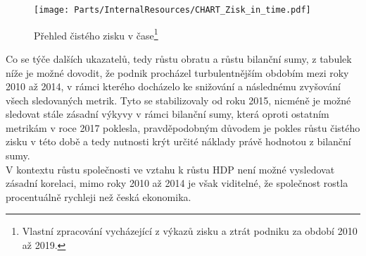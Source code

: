 \newpage

\begin{figure}[!hbtp]
	\centering
	\texttt{[image: Parts/InternalResources/CHART\_Zisk\_in\_time.pdf]}
	\caption[Přehled čistého zisku v čase]{Přehled čistého zisku v čase\footnote{Vlastní zpracování vycházející z výkazů zisku a ztrát podniku za období 2010 až 2019.}}
	\label{fig:Prehled cisteho zisku v case}
\end{figure}

Co se týče dalších ukazatelů, tedy růstu obratu a růstu bilanční sumy, z tabulek níže je možné dovodit, že podnik procházel turbulentnějším obdobím mezi roky 2010 až 2014, v rámci kterého docházelo ke snižování a následnému zvyšování všech sledovaných metrik. Tyto se stabilizovaly od roku 2015, nicméně je možné sledovat stále zásadní výkyvy v rámci bilanční sumy, která oproti ostatním metrikám v roce 2017 poklesla, pravděpodobným důvodem je pokles růstu čistého zisku v této době a tedy nutnosti krýt určité náklady právě hodnotou z bilanční sumy.\\

V kontextu růstu společnosti ve vztahu k růstu HDP není možné vysledovat zásadní korelaci, mimo roky 2010 až 2014 je však viditelné, že společnost rostla procentuálně rychleji než česká ekonomika.\\

\newpage

